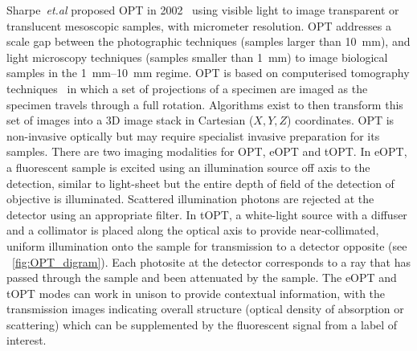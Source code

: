 Sharpe~\emph{et.al} proposed \gls{OPT} in 2002~\cite{sharpeOpticalProjectionTomography2002}
using visible light to image transparent or translucent mesoscopic samples, with micrometer resolution.
\gls{OPT} addresses a scale gap between the photographic techniques (samples larger than \SI{10}{\milli\meter}), and light microscopy techniques (samples smaller than \SI{1}{\milli\meter}) to image biological samples in the \SIrange{1}{10}{\milli\meter} regime.
\gls{OPT} is based on computerised tomography techniques~\cite{[17]} in which a set of projections of a specimen are imaged as the specimen travels through a full rotation.
Algorithms exist to then transform this set of images into a
\gls{3D} image stack in Cartesian (\(X,Y,Z\)) coordinates.
\gls{OPT} is non-invasive optically but may require specialist invasive preparation for its samples.
There are two imaging modalities for \gls{OPT}, \gls{eOPT} and \gls{tOPT}.
In \gls{eOPT}, a fluorescent sample is excited using an illumination source off axis to the detection, similar to \gls{light-sheet} but the entire \gls{depth of field} of the detection of objective is illuminated.
Scattered illumination photons are rejected at the detector using an appropriate filter.
In tOPT, a white-light source with a diffuser and a collimator is placed along the optical axis to provide near-collimated, uniform illumination onto the sample for transmission to a detector opposite (see \figurename~\ref{fig:OPT_digram}).
Each \gls{photosite} at the detector corresponds to a ray that has passed through the sample and been attenuated by the sample.
The \gls{eOPT} and \gls{tOPT} modes can work in unison to provide contextual information, with the transmission images indicating overall structure (optical density of absorption or scattering) which can be supplemented by the fluorescent signal from a label of interest.
%

